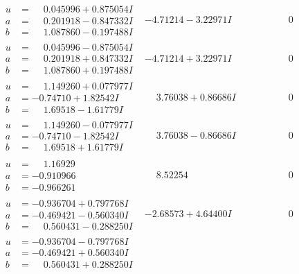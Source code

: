 \documentclass[1p]{elsarticle_modified}
\theoremstyle{definition}
\begin{document}
$$\begin{array}{c|c|c}
\begin{aligned}
u &= \phantom{-}0.045996 + 0.875054 I \\
a &= \phantom{-}0.201918 - 0.847332 I \\
b &= \phantom{-}1.087860 - 0.197488 I\end{aligned}
 & -4.71214 - 3.22971 I & \phantom{-0.000000 } 0 \\ \hline\begin{aligned}
u &= \phantom{-}0.045996 - 0.875054 I \\
a &= \phantom{-}0.201918 + 0.847332 I \\
b &= \phantom{-}1.087860 + 0.197488 I\end{aligned}
 & -4.71214 + 3.22971 I & \phantom{-0.000000 } 0 \\ \hline\begin{aligned}
u &= \phantom{-}1.149260 + 0.077977 I \\
a &= -0.74710 + 1.82542 I \\
b &= \phantom{-}1.69518 - 1.61779 I\end{aligned}
 & \phantom{-}3.76038 + 0.86686 I & \phantom{-0.000000 } 0 \\ \hline\begin{aligned}
u &= \phantom{-}1.149260 - 0.077977 I \\
a &= -0.74710 - 1.82542 I \\
b &= \phantom{-}1.69518 + 1.61779 I\end{aligned}
 & \phantom{-}3.76038 - 0.86686 I & \phantom{-0.000000 } 0 \\ \hline\begin{aligned}
u &= \phantom{-}1.16929\phantom{ +0.000000I} \\
a &= -0.910966\phantom{ +0.000000I} \\
b &= -0.966261\phantom{ +0.000000I}\end{aligned}
 & \phantom{-}8.52254\phantom{ +0.000000I} & \phantom{-0.000000 } 0 \\ \hline\begin{aligned}
u &= -0.936704 + 0.797768 I \\
a &= -0.469421 - 0.560340 I \\
b &= \phantom{-}0.560431 - 0.288250 I\end{aligned}
 & -2.68573 + 4.64400 I & \phantom{-0.000000 } 0 \\ \hline\begin{aligned}
u &= -0.936704 - 0.797768 I \\
a &= -0.469421 + 0.560340 I \\
b &= \phantom{-}0.560431 + 0.288250 I\end{aligned}

\end{array}$$
\end{document}
